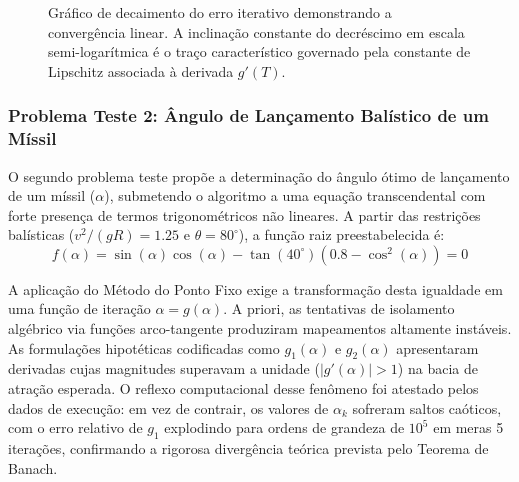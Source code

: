 \begin{figure}[H]
    \centering
    \caption{Gráfico de decaimento do erro iterativo demonstrando a convergência linear. A inclinação constante do decréscimo em escala semi-logarítmica é o traço característico governado pela constante de Lipschitz associada à derivada $g'(T)$.}
    \label{fig:convergencia_ponto_fixo_amplificador}
\end{figure}

\subsubsection{Problema Teste 2: Ângulo de Lançamento Balístico de um Míssil}
\label{subsubsec:problema_teste_2_ponto_fixo}

O segundo problema teste propõe a determinação do ângulo ótimo de lançamento de um míssil ($\alpha$), submetendo o algoritmo a uma equação transcendental com forte presença de termos trigonométricos não lineares. A partir das restrições balísticas ($v^2/(gR) = 1.25$ e $\theta = 80^\circ$), a função raiz preestabelecida é:
\begin{equation}
    f(\alpha) = \sin(\alpha)\cos(\alpha) - \tan(40^\circ)\left(0.8 - \cos^2(\alpha)\right) = 0
\end{equation}

A aplicação do Método do Ponto Fixo exige a transformação desta igualdade em uma função de iteração $\alpha = g(\alpha)$. A priori, as tentativas de isolamento algébrico via funções arco-tangente produziram mapeamentos altamente instáveis. As formulações hipotéticas codificadas como $g_1(\alpha)$ e $g_2(\alpha)$ apresentaram derivadas cujas magnitudes superavam a unidade ($|g'(\alpha)| > 1$) na bacia de atração esperada. O reflexo computacional desse fenômeno foi atestado pelos dados de execução: em vez de contrair, os valores de $\alpha_k$ sofreram saltos caóticos, com o erro relativo de $g_1$ explodindo para ordens de grandeza de $10^5$ em meras 5 iterações, confirmando a rigorosa divergência teórica prevista pelo Teorema de Banach.

